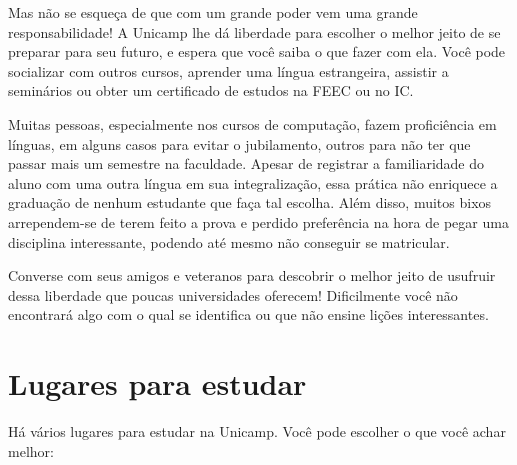 Mas não se esqueça de que com um grande poder vem uma grande responsabilidade!
A Unicamp lhe dá liberdade para escolher o melhor jeito de se preparar para seu
futuro, e espera que você saiba o que fazer com ela. Você pode socializar com
outros cursos, aprender uma língua estrangeira, assistir a seminários ou obter
um certificado de estudos na FEEC ou no IC.

Muitas pessoas, especialmente nos cursos de computação, fazem proficiência em
línguas, em alguns casos para evitar o jubilamento, outros para não ter que
passar mais um semestre na faculdade. Apesar de registrar a familiaridade do
aluno com uma outra língua em sua integralização, essa prática não enriquece
a graduação de nenhum estudante que faça tal escolha. Além disso, muitos bixos
arrependem-se de terem feito a prova e perdido preferência na hora de pegar uma
disciplina interessante, podendo até mesmo não conseguir se matricular.

Converse com seus amigos e veteranos para descobrir o melhor jeito de usufruir
dessa liberdade que poucas universidades oferecem! Dificilmente você não
encontrará algo com o qual se identifica ou que não ensine lições interessantes.

\newpage
\section{Lugares para estudar}

Há vários lugares para estudar na Unicamp. Você pode escolher o que você achar
melhor:

